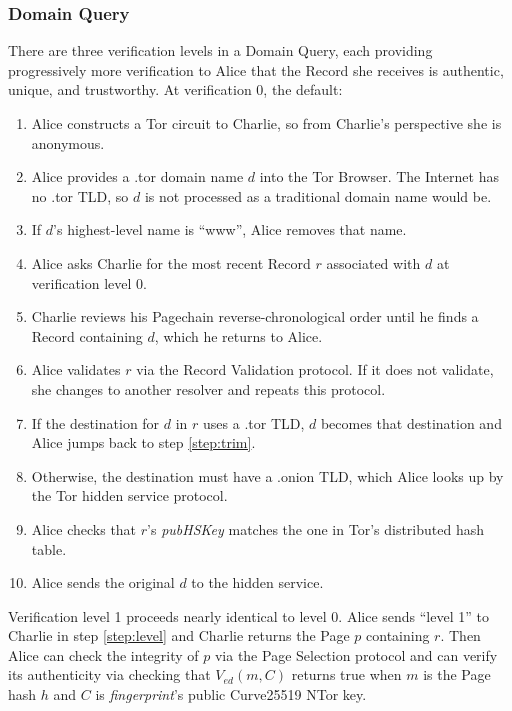 \subsubsection{Domain Query}

There are three verification levels in a Domain Query, each providing progressively more verification to Alice that the Record she receives is authentic, unique, and trustworthy. At verification 0, the default:


\begin{enumerate}
	\item Alice constructs a Tor circuit to Charlie, so from Charlie's perspective she is anonymous.
	\item Alice provides a .tor domain name $ d $ into the Tor Browser. The Internet has no .tor TLD, so $ d $ is not processed as a traditional domain name would be.
	\item \label{step:trim} If $ d $'s highest-level name is ``www'', Alice removes that name.
	\item \label{step:level} Alice asks Charlie for the most recent Record $ r $ associated with $ d $ at verification level 0.
	\item Charlie reviews his Pagechain reverse-chronological order until he finds a Record containing $ d $, which he returns to Alice.
	\item Alice validates $ r $ via the Record Validation protocol. If it does not validate, she changes to another resolver and repeats this protocol.
	\item If the destination for $ d $ in $ r $ uses a .tor TLD, $ d $ becomes that destination and Alice jumps back to step \ref{step:trim}.
	\item Otherwise, the destination must have a .onion TLD, which Alice looks up by the Tor hidden service protocol.
	\item Alice checks that $ r $'s \emph{pubHSKey} matches the one in Tor's distributed hash table.
	\item Alice sends the original $ d $ to the hidden service.
\end{enumerate}

Verification level 1 proceeds nearly identical to level 0. Alice sends ``level 1'' to Charlie in step \ref{step:level} and Charlie returns the Page $ p $ containing $ r $. Then Alice can check the integrity of $ p $ via the Page Selection protocol and can verify its authenticity via checking that $ V_{\mathit{ed}}(m, C) $ returns true when $ m $ is the Page hash $ h $ and $ C $ is \emph{fingerprint}'s public Curve25519 NTor key.

